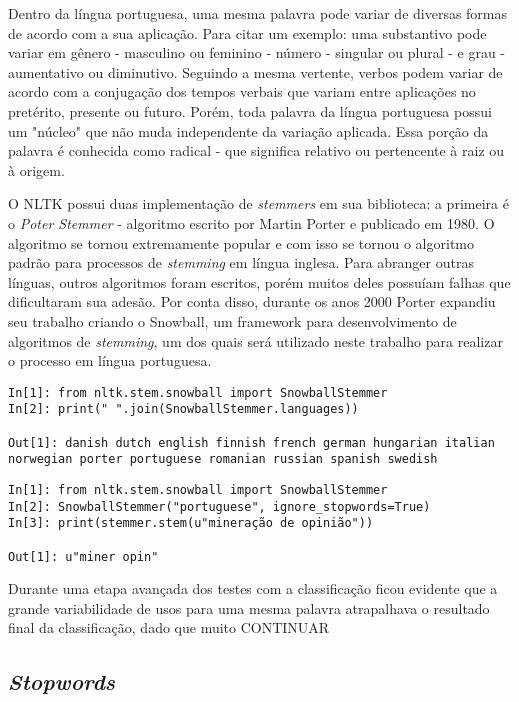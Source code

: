 Dentro da língua portuguesa, uma mesma palavra pode variar de diversas formas de acordo com a sua aplicação. Para citar um exemplo: uma substantivo pode variar em gênero - masculino ou feminino - número - singular ou plural - e grau - aumentativo ou diminutivo. Seguindo a mesma vertente, verbos podem variar de acordo com a conjugação dos tempos verbais que variam entre aplicações no pretérito, presente ou futuro.
Porém, toda palavra da língua portuguesa possui um "núcleo" que não muda independente da variação aplicada. Essa porção da palavra é conhecida como radical - que significa relativo ou pertencente à raiz ou à origem. 

O NLTK possui duas implementação de \textit{stemmers} em sua biblioteca: a primeira é o \textit{Poter Stemmer} - algoritmo escrito por Martin Porter e publicado em 1980. O algoritmo se tornou extremamente popular e com isso se tornou o algoritmo padrão para processos de \textit{stemming} em língua inglesa. Para abranger outras línguas, outros algoritmos foram escritos, porém muitos deles possuíam falhas que dificultaram sua adesão. Por conta disso, durante os anos 2000 Porter expandiu seu trabalho criando o Snowball\cite{snowball}, um framework para desenvolvimento de algoritmos de \textit{stemming}, um dos quais será utilizado neste trabalho para realizar o processo em língua portuguesa. 

\begin{lstlisting}[style=python, frame=single]
In[1]: from nltk.stem.snowball import SnowballStemmer
In[2]: print(" ".join(SnowballStemmer.languages))

Out[1]: danish dutch english finnish french german hungarian italian
norwegian porter portuguese romanian russian spanish swedish
\end{lstlisting}


\begin{lstlisting}[style=python, frame=single]
In[1]: from nltk.stem.snowball import SnowballStemmer
In[2]: SnowballStemmer("portuguese", ignore_stopwords=True)
In[3]: print(stemmer.stem(u"mineração de opinião"))

Out[1]: u"miner opin"
\end{lstlisting}

Durante uma etapa avançada dos testes com a classificação ficou evidente que a grande variabilidade de usos para uma mesma palavra atrapalhava o resultado final da classificação, dado que muito CONTINUAR

\subsection{\textit{Stopwords}}

